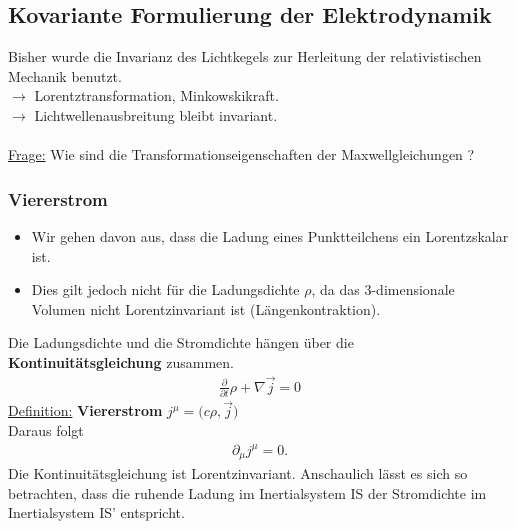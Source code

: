 \subsection{Kovariante Formulierung der Elektrodynamik}
Bisher wurde die Invarianz des Lichtkegels zur Herleitung der relativistischen Mechanik benutzt.\\
$\longrightarrow$ Lorentztransformation, Minkowskikraft.\\
$\longrightarrow$ Lichtwellenausbreitung bleibt invariant.\\ \\
\underline{Frage:} Wie sind die Transformationseigenschaften der Maxwellgleichungen ?\\
\subsubsection{Viererstrom}
\begin{itemize}
\item Wir gehen davon aus, dass die Ladung eines Punktteilchens ein Lorentzskalar ist.
\item Dies gilt jedoch nicht für die Ladungsdichte $\rho$, da das 3-dimensionale Volumen nicht Lorentzinvariant ist (Längenkontraktion).
\end{itemize}
Die Ladungsdichte und die Stromdichte hängen über die {\bf Kontinuitätsgleichung} zusammen.
\begin{eqnarray*} \frac{\partial}{\partial t} \rho + \nabla \vec j = 0 \end{eqnarray*}
\underline{Definition:} {\bf Viererstrom} $j^{\mu} = \big ( c\rho, \vec j\big)$\\
Daraus folgt \begin{eqnarray*} \partial_{\mu}j^{\mu}  = 0 .\end{eqnarray*}
Die  Kontinuitätsgleichung ist Lorentzinvariant. Anschaulich lässt es sich so betrachten, dass die ruhende Ladung im Inertialsystem IS der Stromdichte im Inertialsystem IS' entspricht.

